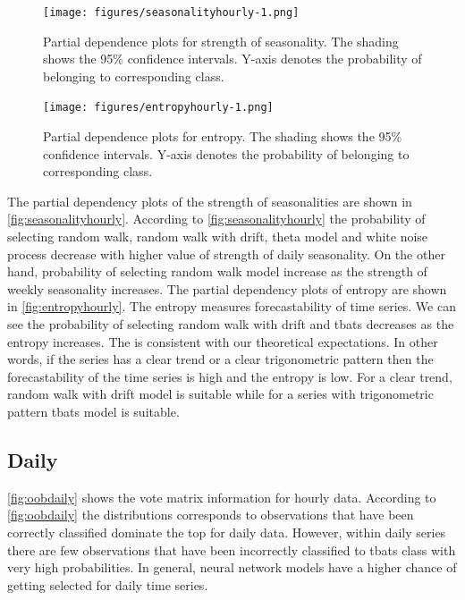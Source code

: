 \documentclass[11pt,a4paper,]{article}
\begin{document}
\begin{figure}
\centering
\texttt{[image: figures/seasonalityhourly-1.png]}
\caption{\label{fig:seasonalityhourly}Partial dependence plots for strength
of seasonality. The shading shows the 95\% confidence intervals. Y-axis
denotes the probability of belonging to corresponding class.}
\end{figure}

\begin{figure}
\centering
\texttt{[image: figures/entropyhourly-1.png]}
\caption{\label{fig:entropyhourly}Partial dependence plots for entropy. The
shading shows the 95\% confidence intervals. Y-axis denotes the
probability of belonging to corresponding class.}
\end{figure}

The partial dependency plots of the strength of seasonalities are shown
in \autoref{fig:seasonalityhourly}. According to
\autoref{fig:seasonalityhourly} the probability of selecting random
walk, random walk with drift, theta model and white noise process
decrease with higher value of strength of daily seasonality. On the
other hand, probability of selecting random walk model increase as the
strength of weekly seasonality increases. The partial dependency plots
of entropy are shown in \autoref{fig:entropyhourly}. The entropy
measures forecastability of time series. We can see the probability of
selecting random walk with drift and tbats decreases as the entropy
increases. The is consistent with our theoretical expectations. In other
words, if the series has a clear trend or a clear trigonometric pattern
then the forecastability of the time series is high and the entropy is
low. For a clear trend, random walk with drift model is suitable while
for a series with trigonometric pattern tbats model is suitable.

\subsection{Daily}\label{daily}

\autoref{fig:oobdaily} shows the vote matrix information for hourly
data. According to \autoref{fig:oobdaily} the distributions corresponds
to observations that have been correctly classified dominate the top for
daily data. However, within daily series there are few observations that
have been incorrectly classified to tbats class with very high
probabilities. In general, neural network models have a higher chance of
getting selected for daily time series.
\end{document}
